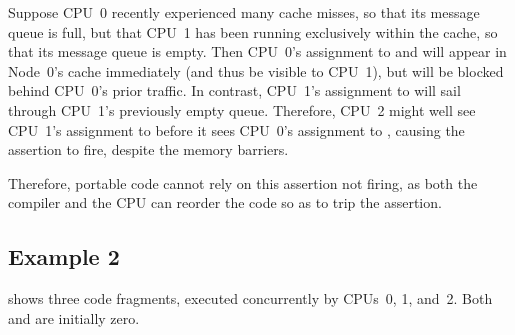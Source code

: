 Suppose CPU~0 recently experienced many cache misses, so that its
message queue is full, but that CPU~1 has been running exclusively within
the cache, so that its message queue is empty.
Then CPU~0's assignment to  and  will appear in Node~0's cache
immediately (and thus be visible to CPU~1), but will be blocked behind
CPU~0's prior traffic.
In contrast, CPU~1's assignment to  will sail through CPU~1's
previously empty queue.
Therefore, CPU~2 might well see CPU~1's assignment to  before
it sees CPU~0's assignment to , causing the assertion to fire,
despite the memory barriers.

Therefore, portable code cannot rely on this assertion not firing,
as both the compiler and the CPU can reorder the code so as to trip
the assertion.

\QuickQuizEnd

\subsection{Example 2}
\label{sec:app:whymb:Example 2}

shows three code fragments, executed concurrently by CPUs~0, 1, and~2.
Both  and  are initially zero.

\begin{listing}
\scriptsize
{}
\caption{Memory Barrier Example 2}
\label{lst:app:whymb:Memory Barrier Example 2}
\end{listing}

